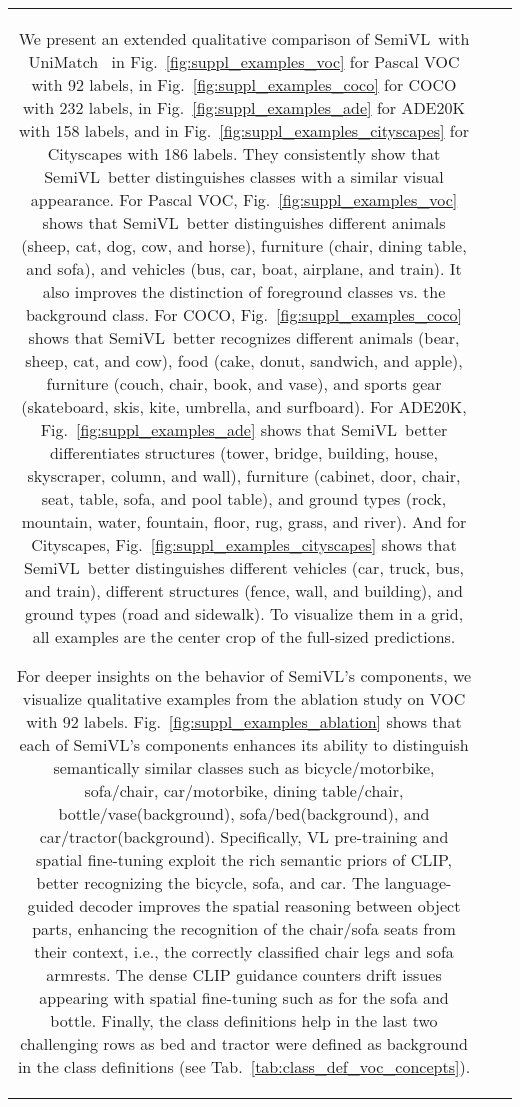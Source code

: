 \documentclass[10pt,twocolumn,letterpaper]{article}
\newcommand{\ours}{SemiVL}
\begin{document}
\begin{figure*}
\begin{tabular}{ccc}
We present an extended qualitative comparison of \ours\ with UniMatch~\cite{yang2023revisiting} in Fig.~\ref{fig:suppl_examples_voc} for Pascal VOC with 92 labels, in Fig.~\ref{fig:suppl_examples_coco} for COCO with 232 labels, in Fig.~\ref{fig:suppl_examples_ade} for ADE20K with 158 labels, and in Fig.~\ref{fig:suppl_examples_cityscapes} for Cityscapes with 186 labels. They consistently show that \ours\ better distinguishes classes with a similar visual appearance. For Pascal VOC, Fig.~\ref{fig:suppl_examples_voc} shows that \ours\ better distinguishes different animals (sheep, cat, dog, cow, and horse), furniture (chair, dining table, and sofa), and vehicles (bus, car, boat, airplane, and train). It also improves the distinction of foreground classes vs. the background class. For COCO, Fig.~\ref{fig:suppl_examples_coco} shows that \ours\ better recognizes different animals (bear, sheep, cat, and cow), food (cake, donut, sandwich, and apple), furniture (couch, chair, book, and vase), and sports gear (skateboard, skis, kite, umbrella, and surfboard). For ADE20K, Fig.~\ref{fig:suppl_examples_ade} shows that \ours\ better differentiates structures (tower, bridge, building, house, skyscraper, column, and wall), furniture (cabinet, door, chair, seat, table, sofa, and pool table), and ground types (rock, mountain, water, fountain, floor, rug, grass, and river). And for Cityscapes, Fig.~\ref{fig:suppl_examples_cityscapes} shows that \ours\ better distinguishes different vehicles (car, truck, bus, and train), different structures (fence, wall, and building), and ground types (road and sidewalk). To visualize them in a grid, all examples are the center crop of the full-sized predictions.

For deeper insights on the behavior of SemiVL's components, we visualize qualitative examples from the ablation study on VOC with 92 labels. Fig.~\ref{fig:suppl_examples_ablation} shows that each of SemiVL's components enhances its ability to distinguish semantically similar classes such as bicycle/motorbike, sofa/chair, car/motorbike, dining table/chair, bottle/vase(background), sofa/bed(background), and car/tractor(background). Specifically, VL pre-training and spatial fine-tuning exploit the rich semantic priors of CLIP, better recognizing the bicycle, sofa, and car. The language-guided decoder improves the spatial reasoning between object parts, enhancing the recognition of the chair/sofa seats from their context, i.e., the correctly classified chair legs and sofa armrests. The dense CLIP guidance counters drift issues appearing with spatial fine-tuning such as for the sofa and bottle. Finally, the class definitions help in the last two challenging rows as bed and tractor were defined as background in the class definitions (see Tab.~\ref{tab:class_def_voc_concepts}).



\end{tabular}
\end{figure*}
\end{document}

